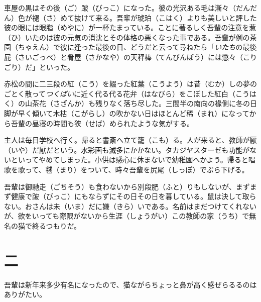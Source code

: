 \documentclass{book}
\begin{document}
車屋の黒はその後（ご）跛（びっこ）になった。彼の光沢ある毛は漸々（だんだん）色が褪（さ）めて抜けて来る。吾輩が琥珀（こはく）よりも美しいと評した彼の眼には眼脂（めやに）が一杯たまっている。ことに著るしく吾輩の注意を惹（ひ）いたのは彼の元気の消沈とその体格の悪くなった事である。吾輩が例の茶園（ちゃえん）で彼に逢った最後の日、どうだと云って尋ねたら「\emph{いたち}の最後屁（さいごっぺ）と肴屋（さかなや）の天秤棒（てんびんぼう）には懲々（こりごり）だ」といった。

赤松の間に二三段の紅（こう）を綴った紅葉（こうよう）は昔（むか）しの夢のごとく散って\emph{つくばい}に近く代る代る花弁（はなびら）をこぼした紅白（こうはく）の山茶花（さざんか）も残りなく落ち尽した。三間半の南向の椽側に冬の日脚が早く傾いて木枯（こがらし）の吹かない日はほとんど稀（まれ）になってから吾輩の昼寝の時間も狭（せば）められたような気がする。

主人は毎日学校へ行く。帰ると書斎へ立て籠（こも）る。人が来ると、教師が厭（いや）だ厭だという。水彩画も滅多にかかない。タカジヤスターゼも功能がないといってやめてしまった。小供は感心に休まないで幼稚園へかよう。帰ると唱歌を歌って、毬（まり）をついて、時々吾輩を尻尾（しっぽ）でぶら下げる。

吾輩は御馳走（ごちそう）も食わないから別段肥（ふと）りもしないが、まずまず健康で跛（びっこ）にもならずにその日その日を暮している。鼠は決して取らない。おさんは未（いま）だに嫌（きら）いである。名前はまだつけてくれないが、欲をいっても際限がないから生涯（しょうがい）この教師の家（うち）で無名の猫で終るつもりだ。

\chapter*{二}

吾輩は新年来多少有名になったので、猫ながらちょっと鼻が高く感ぜらるるのはありがたい。
\end{document}
